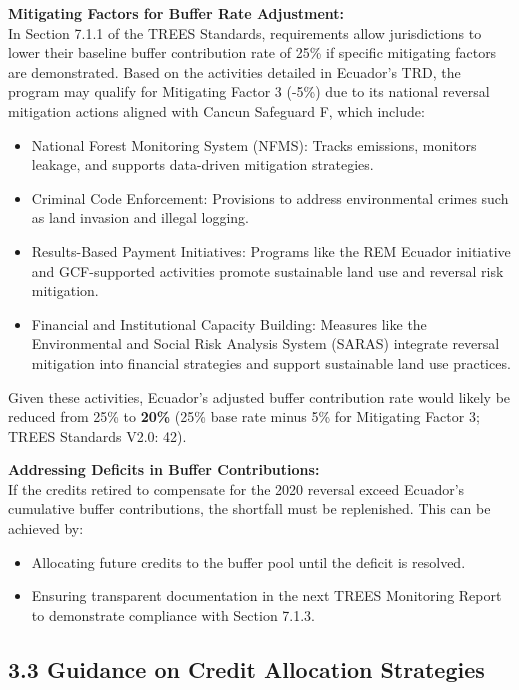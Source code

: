 \documentclass[
  letterpaper,
  DIV=11,
  numbers=noendperiod]{scrartcl}
\providecommand{\tightlist}{%
  \setlength{\itemsep}{0pt}\setlength{\parskip}{0pt}}\usepackage{longtable,booktabs,array}
\begin{document}
\textbf{Mitigating Factors for Buffer Rate Adjustment:}\\
In Section 7.1.1 of the TREES Standards, requirements allow
jurisdictions to lower their baseline buffer contribution rate of 25\%
if specific mitigating factors are demonstrated. Based on the activities
detailed in Ecuador's TRD, the program may qualify for Mitigating Factor
3 (-5\%) due to its national reversal mitigation actions aligned with
Cancun Safeguard F, which include:

\begin{itemize}
\tightlist
\item
  National Forest Monitoring System (NFMS): Tracks emissions, monitors
  leakage, and supports data-driven mitigation strategies.
\item
  Criminal Code Enforcement: Provisions to address environmental crimes
  such as land invasion and illegal logging.
\item
  Results-Based Payment Initiatives: Programs like the REM Ecuador
  initiative and GCF-supported activities promote sustainable land use
  and reversal risk mitigation.
\item
  Financial and Institutional Capacity Building: Measures like the
  Environmental and Social Risk Analysis System (SARAS) integrate
  reversal mitigation into financial strategies and support sustainable
  land use practices.
\end{itemize}

Given these activities, Ecuador's adjusted buffer contribution rate
would likely be reduced from 25\% to \textbf{20\%} (25\% base rate minus
5\% for Mitigating Factor 3; TREES Standards V2.0: 42).

\textbf{Addressing Deficits in Buffer Contributions:}\\
If the credits retired to compensate for the 2020 reversal exceed
Ecuador's cumulative buffer contributions, the shortfall must be
replenished. This can be achieved by:

\begin{itemize}
\tightlist
\item
  Allocating future credits to the buffer pool until the deficit is
  resolved.
\item
  Ensuring transparent documentation in the next TREES Monitoring Report
  to demonstrate compliance with Section 7.1.3.
\end{itemize}

\hypertarget{guidance-on-credit-allocation-strategies}{%
\subsection{\texorpdfstring{\textbf{3.3 Guidance on Credit Allocation
Strategies}}{3.3 Guidance on Credit Allocation Strategies}}\label{guidance-on-credit-allocation-strategies}}
\end{document}
